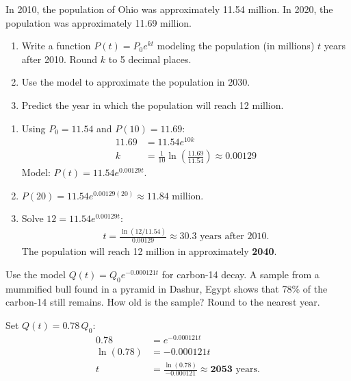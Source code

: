 \documentclass{ximera}
\begin{document}
\begin{problem}
In 2010, the population of Ohio was approximately 11.54 million. In 2020, the population was approximately 11.69 million.
\begin{enumerate}
  \item[(a)] Write a function $P(t) = P_0 e^{kt}$ modeling the population (in millions) $t$ years after 2010. Round $k$ to 5 decimal places.
  \medskip
  \item[(b)] Use the model to approximate the population in 2030.
  \medskip
  \item[(c)] Predict the year in which the population will reach 12 million.
\end{enumerate}

\begin{solution}
\begin{enumerate}
  \item[(a)] Using $P_0=11.54$ and $P(10)=11.69$:
  \begin{align*}
    11.69 &= 11.54e^{10k}\\
    k &= \frac{1}{10}\ln\!\left(\frac{11.69}{11.54}\right) \approx 0.00129
  \end{align*}
  Model: $P(t) = 11.54e^{0.00129t}$.

  \item[(b)] $P(20) = 11.54e^{0.00129(20)} \approx \mathbf{11.84}$ million.

  \item[(c)] Solve $12 = 11.54e^{0.00129t}$:
  \begin{align*}
    t = \frac{\ln(12/11.54)}{0.00129} \approx 30.3 \text{ years after 2010.}
  \end{align*}
  The population will reach 12 million in approximately \textbf{2040}.
\end{enumerate}
\end{solution}
\end{problem}


\begin{problem}
Use the model $Q(t) = Q_0 e^{-0.000121t}$ for carbon-14 decay. A sample from a mummified bull found in a pyramid in Dashur, Egypt shows that 78\% of the carbon-14 still remains. How old is the sample? Round to the nearest year.

\begin{solution}
Set $Q(t) = 0.78\,Q_0$:
\begin{align*}
  0.78 &= e^{-0.000121t}\\
  \ln(0.78) &= -0.000121t\\
  t &= \frac{\ln(0.78)}{-0.000121} \approx \mathbf{2053}\text{ years.}
\end{align*}
\end{solution}
\end{problem}
\end{document}
